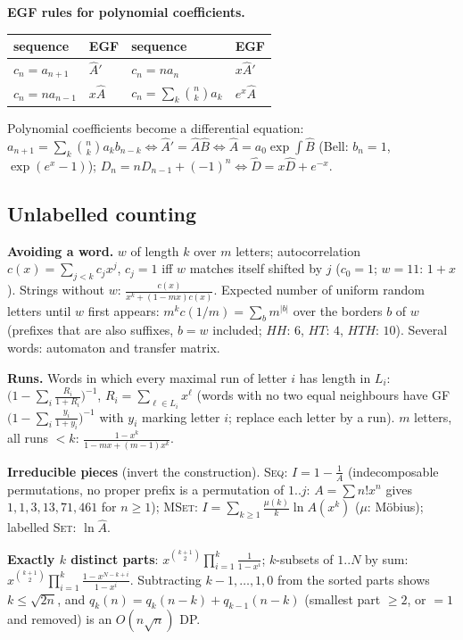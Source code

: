	\textbf{EGF rules for polynomial coefficients.}
	\begin{center}\small\renewcommand{\arraystretch}{1.3}
	\begin{tabular}{@{}l@{\ \ }l@{\qquad}l@{\ \ }l@{}}
	sequence & EGF & sequence & EGF \\ \hline
	$c_n=a_{n+1}$ & $\hat A'$ & $c_n=na_n$ & $x\hat A'$ \\
	$c_n=na_{n-1}$ & $x\hat A$ & $c_n=\sum_k\binom nka_k$ & $e^x\hat A$ \\
	\end{tabular}
	\end{center}
	Polynomial coefficients become a differential equation: $a_{n+1}=\sum_k\binom nka_kb_{n-k}\iff\hat A'=\hat A\hat B\iff\hat A=a_0\exp\int\hat B$ (Bell: $b_n=1$, $\exp(e^x-1)$); $D_n=nD_{n-1}+(-1)^n\iff\hat D=x\hat D+e^{-x}$.

	\subsection{Unlabelled counting}
	\textbf{Avoiding a word.} $w$ of length $k$ over $m$ letters; autocorrelation $c(x)=\sum_{j<k}c_jx^j$, $c_j=1$ iff $w$ matches itself shifted by $j$ ($c_0=1$; $w=11$: $1+x$). Strings without $w$: $\frac{c(x)}{x^k+(1-mx)c(x)}$. Expected number of uniform random letters until $w$ first appears: $m^kc(1/m)=\sum_bm^{|b|}$ over the borders $b$ of $w$ (prefixes that are also suffixes, $b=w$ included; $HH$: $6$, $HT$: $4$, $HTH$: $10$). Several words: automaton and transfer matrix.

	\textbf{Runs.} Words in which every maximal run of letter $i$ has length in $L_i$: $\big(1-\sum_i\frac{R_i}{1+R_i}\big)^{-1}$, $R_i=\sum_{\ell\in L_i}x^\ell$ (words with no two equal neighbours have GF $\big(1-\sum_i\frac{y_i}{1+y_i}\big)^{-1}$ with $y_i$ marking letter $i$; replace each letter by a run). $m$ letters, all runs $<k$: $\frac{1-x^k}{1-mx+(m-1)x^k}$.

	\textbf{Irreducible pieces} (invert the construction). \textsc{Seq}: $I=1-\frac1A$ (indecomposable permutations, no proper prefix is a permutation of $1..j$: $A=\sum n!x^n$ gives $1,1,3,13,71,461$ for $n\ge1$); \textsc{MSet}: $I=\sum_{k\ge1}\frac{\mu(k)}k\ln A(x^k)$ ($\mu$: M\"obius); labelled \textsc{Set}: $\ln\hat A$.

	\textbf{Exactly $k$ distinct parts}: $x^{\binom{k+1}2}\prod_{i=1}^k\frac1{1-x^i}$; $k$-subsets of $1..N$ by sum: $x^{\binom{k+1}2}\prod_{i=1}^k\frac{1-x^{N-k+i}}{1-x^i}$. Subtracting $k-1,\dots,1,0$ from the sorted parts shows $k\le\sqrt{2n}$, and $q_k(n)=q_k(n-k)+q_{k-1}(n-k)$ (smallest part $\ge2$, or $=1$ and removed) is an $O(n\sqrt n)$ DP.

